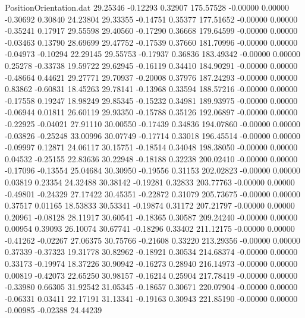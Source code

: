 \begin{filecontents}{PositionOrientation.dat}
  29.25346   -0.12293    0.32907   175.57528   -0.00000    0.00000   -0.30692    0.30840   24.23804
  29.33355   -0.14751    0.35377   177.51652   -0.00000    0.00000   -0.35241    0.17917   29.55598
  29.40560   -0.17290    0.36668   179.64599   -0.00000    0.00000   -0.03463    0.13790   28.69699
  29.47752   -0.17539    0.37660   181.70996   -0.00000    0.00000   -0.04973   -0.10294   22.29145
  29.55753   -0.17937    0.36836   183.49342   -0.00000    0.00000    0.25278   -0.33738   19.59722
  29.62945   -0.16119    0.34410   184.90291   -0.00000    0.00000   -0.48664    0.44621   29.27771
  29.70937   -0.20008    0.37976   187.24293   -0.00000    0.00000    0.83862   -0.60831   18.45263
  29.78141   -0.13968    0.33594   188.57216   -0.00000    0.00000   -0.17558    0.19247   18.98249
  29.85345   -0.15232    0.34981   189.93975   -0.00000    0.00000   -0.06944    0.01811   26.60119
  29.93350   -0.15788    0.35126   192.06897   -0.00000    0.00000   -0.22925   -0.04021   27.91110
  30.00550   -0.17439    0.34836   194.07860   -0.00000    0.00000   -0.03826   -0.25248   33.00996
  30.07749   -0.17714    0.33018   196.45514   -0.00000    0.00000   -0.09997    0.12871   24.06117
  30.15751   -0.18514    0.34048   198.38050   -0.00000    0.00000    0.04532   -0.25155   22.83636
  30.22948   -0.18188    0.32238   200.02410   -0.00000    0.00000   -0.17096   -0.13554   25.04684
  30.30950   -0.19556    0.31153   202.02823   -0.00000    0.00000    0.03819    0.23354   24.32488
  30.38142   -0.19281    0.32833   203.77763   -0.00000    0.00000   -0.49801   -0.24329   27.17422
  30.45351   -0.22872    0.31079   205.73675   -0.00000    0.00000    0.37517    0.01165   18.53833
  30.53341   -0.19874    0.31172   207.21797   -0.00000    0.00000    0.20961   -0.08128   28.11917
  30.60541   -0.18365    0.30587   209.24240   -0.00000    0.00000    0.00954    0.39093   26.10074
  30.67741   -0.18296    0.33402   211.12175   -0.00000    0.00000   -0.41262   -0.02267   27.06375
  30.75766   -0.21608    0.33220   213.29356   -0.00000    0.00000    0.37339   -0.37323   19.31778
  30.82962   -0.18921    0.30534   214.68374   -0.00000    0.00000    0.33173   -0.19974   18.37226
  30.90942   -0.16273    0.28940   216.14973   -0.00000    0.00000    0.00819   -0.42073   22.65250
  30.98157   -0.16214    0.25904   217.78419   -0.00000    0.00000   -0.33980    0.66305   31.92542
  31.05345   -0.18657    0.30671   220.07904   -0.00000    0.00000   -0.06331    0.03411   22.17191
  31.13341   -0.19163    0.30943   221.85190   -0.00000    0.00000   -0.00985   -0.02388   24.44239

\end{filecontents}
